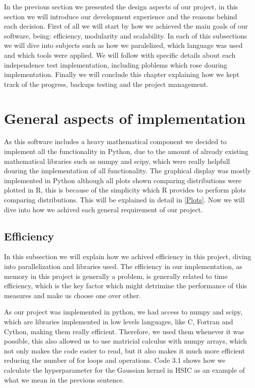 In the previous section we presented the design aspects of our project, in this section we will introduce our development experience and the reasons behind each decision.
First of all we will start by how we achieved the main goals of our software, being: efficiency, modularity and scalability. In each of this subsections we will dive into subjects such as how we paralelized, which language was used and which tools were applied. We will follow with specific details about each independence test implementation, including ploblems which rose douring implementation. Finally we will conclude this chapter explaining how we kept track of the progress, backups testing and the project management. 

\section{General aspects of implementation}

As this software includes a heavy mathematical component we decided to implement all the functionality in Python, due to the amount of already existing mathematical libraries such as numpy and scipy, which were really helpfull douring the implementation of all functionality. The graphical display was mostly implemented in Python although all plots shown comparing distributions were plotted in R, this is because of the simplicity which R provides to perform plots comparing distributions. This will be explained in detail in \ref{Plots}.
Now we will dive into how we achived each general requirement of our project.


\subsection{Efficiency}

In this subsection we will explain how we achived efficiency in this project, diving into parallelization and libraries used. The efficiency in our implementation, as memory in this project is generally a problem, is generally related to time efficiency, which is the key factor which might detrimine the performance of this measures and make us choose one over other.

As our project was implemented in python, we had access to numpy and scipy, which are libraries implemented in low levels languages, like C, Fortran and Cython, making them really efficient. Therefore, we used them whenever it was possible, this also allowed us to use matricial calculus with numpy arrays, which not only makes the code easier to read, but it also makes it much more efficient reducing the number of for loops and operations. Code 3.1 shows how we calculate the hyperparameter for the Gaussian kernel in HSIC as an example of what we mean in the previous sentence.

